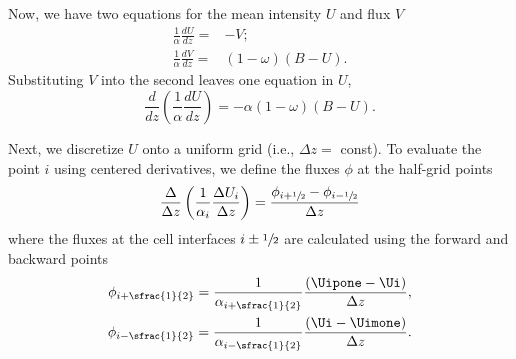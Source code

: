 Now, we have two equations for the mean intensity $U$ and flux $V$
\begin{align}
    \frac{1}{\alpha}\frac{dU}{dz} =& -V; \label{eqn:dUdz} \\
    \frac{1}{\alpha}\frac{dV}{dz} =& (1-\omega)(B-U). \label{eqn:dVdz}
\end{align}
Substituting $V$ into the second leaves one equation in $U$,
\begin{equation}\label{eqn:ddU/ddz}
    \frac{d}{dz} \left( \frac{1}{\alpha} \frac{dU}{dz} \right) = -\alpha(1-\omega)(B-U).
\end{equation}

Next, we discretize $U$ onto a uniform grid (i.e., $\Delta z =$ const).
To evaluate the point $i$ using centered derivatives, we define the fluxes $\phi$ at the half-grid points
\begin{equation}\label{eqn:U_i-discrete}
    \frac{\Delta}{\Delta z} \left( \frac{1}{\alpha_i}\frac{\Delta U_i}{\Delta z} \right) = \frac{\phi_{i+\sfrac{1}{2}} - \phi_{i-\sfrac{1}{2}}}{\Delta z}
\end{equation}
where the fluxes at the cell interfaces $i\pm\sfrac{1}{2}$ are calculated using the forward and backward points
\begin{eqnarray}
    \phi_{i+\sfrac{1}{2}} = \frac{1}{\alpha_{i+\sfrac{1}{2}}} \frac{(\Uipone - \Ui)}{\Delta z}, \\
    \phi_{i-\sfrac{1}{2}} = \frac{1}{\alpha_{i-\sfrac{1}{2}}} \frac{(\Ui - \Uimone)}{\Delta z}.
\end{eqnarray}

